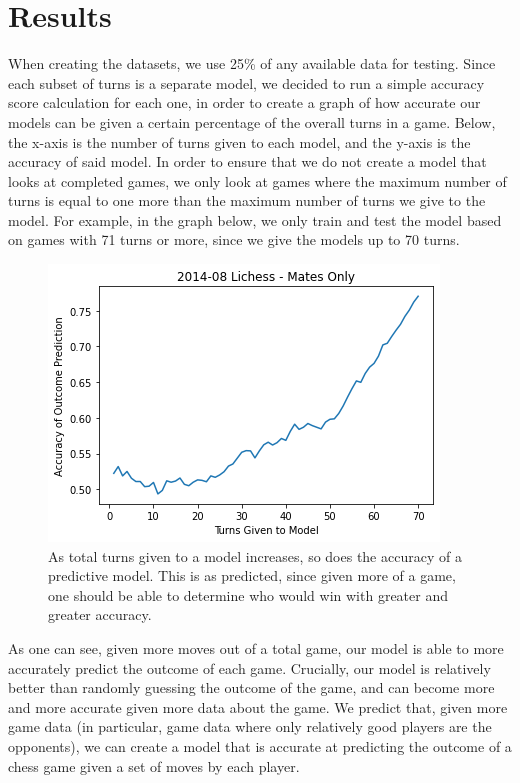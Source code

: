 \documentclass[]{interact}
\theoremstyle{plain}%
\theoremstyle{definition}
\theoremstyle{remark}
\begin{document}
\section{Results}
When creating the datasets, we use 25\% of any available data for testing. Since each subset of turns is a separate model, we decided to run a simple accuracy score calculation for each one, in order to create a graph of how accurate our models can be given a certain percentage of the overall turns in a game. Below, the x-axis is the number of turns given to each model, and the y-axis is the accuracy of said model. In order to ensure that we do not create a model that looks at completed games, we only look at games where the maximum number of turns is equal to one more than the maximum number of turns we give to the model. For example, in the graph below, we only train and test the model based on games with 71 turns or more, since we give the models up to 70 turns.

\begin{figure}[H]
\centering
\includegraphics[scale=0.5]{0to70mates.png}
\caption{As total turns given to a model increases, so does the accuracy of a predictive model. This is as predicted, since given more of a game, one should be able to determine who would win with greater and greater accuracy.}
\end{figure}

As one can see, given more moves out of a total game, our model is able to more accurately predict the outcome of each game. Crucially, our model is relatively better than randomly guessing the outcome of the game, and can become more and more accurate given more data about the game. We predict that, given more game data (in particular, game data where only relatively good players are the opponents), we can create a model that is accurate at predicting the outcome of a chess game given a set of moves by each player.
\end{document}
